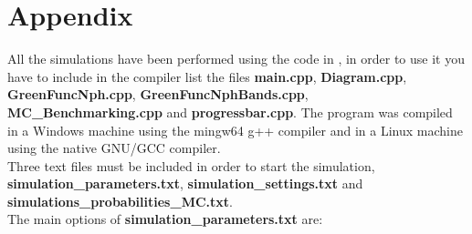 \section*{Appendix}
All the simulations have been performed using the code in \cite{github_repo}, in order to use it you have to 
include in the compiler list the files \textbf{main.cpp}, \textbf{Diagram.cpp}, \textbf{GreenFuncNph.cpp}, \textbf{GreenFuncNphBands.cpp}, 
\textbf{MC\_Benchmarking.cpp} and \textbf{progressbar.cpp}. The program was compiled in a Windows machine using the mingw64 g++ compiler 
and in a Linux machine using the native GNU/GCC compiler.\\
Three text files must be included in order to start the simulation, \textbf{simulation\_parameters.txt}, \textbf{simulation\_settings.txt} and 
\textbf{simulations\_probabilities\_MC.txt}.\\
The main options of \textbf{simulation\_parameters.txt} are:
